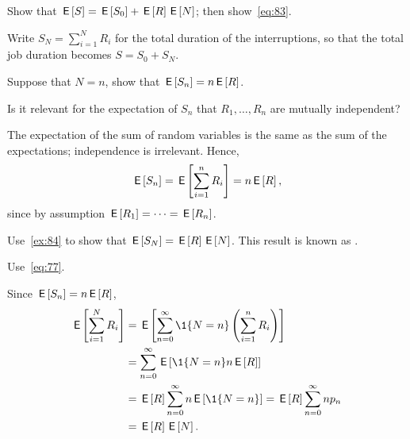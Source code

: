 \begin{exercise}
  Show that $\,\mathsf{E}\left[S\right] = \,\mathsf{E}\left[S_0\right] + \,\mathsf{E}\left[R\right] \,\mathsf{E}\left[N\right]$; then show~\cref{eq:83}.
  \begin{solution}
Write  $S_N = \sum_{i=1}^N R_i$ for the total duration of the interruptions, so that the total job duration becomes $S = S_0 + S_N$.    

  \end{solution}
\end{exercise}


\begin{extra}\label{ex:84}
  Suppose that $N=n$, show that $\,\mathsf{E}\left[S_n\right]=n\,\mathsf{E}\left[R\right]$.
\begin{hint}
    Is it relevant  for the expectation of $S_n$ that $R_1,\ldots, R_n$ are mutually independent?
  \end{hint}
\begin{solution}
The expectation of the sum of random variables is the same as the sum of the expectations; independence is irrelevant. Hence,
\begin{equation*}
  \,\mathsf{E}\left[S_n \right] =  \,\mathsf{E}\left[\sum_{i=1}^n R_i\right]=  n \,\mathsf{E}\left[R\right], 
\end{equation*}
since by assumption $\,\mathsf{E}\left[R_1\right] = \cdots = \,\mathsf{E}\left[R_n\right]$. 
\end{solution}
\end{extra}


\begin{extra}\label{ex:16}
  Use~\cref{ex:84} to show that $\,\mathsf{E}\left[S_N\right]=\,\mathsf{E}\left[R\right] \,\mathsf{E}\left[N\right]$.
  This result is known as .
\begin{hint}
  Use~\cref{eq:77}. 
\end{hint}
\begin{solution}
Since $\,\mathsf{E}\left[S_n\right] = n \,\mathsf{E}\left[R\right]$, 
\begin{align*}
  \E{\sum_{i=1}^N R_i} 
&=  \E{ \sum_{n=0}^\infty \1{N=n} \left(\sum_{i=1}^n R_i \right)} \\
&=  \sum_{n=0}^\infty \E{\1{N=n} n\E{R}} \\
&=  \E{R} \sum_{n=0}^\infty n \E{\1{N=n}} = \E R \sum_{n=0}^\infty n p_n\\
&= \E R \E N.
\end{align*}
\end{solution}
\end{extra}


